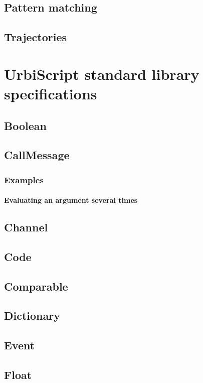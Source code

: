 \documentclass[openright,twoside,12pt]{report}
\newcommand{\us}{UrbiScript\xspace}
\begin{document}
\FloatBarrier
\section{Pattern matching}
\FloatBarrier
\section{Trajectories}

\chapter{\us standard library specifications}
\label{chap:std}

\section{Boolean}
\section{CallMessage}
\label{sect:std-callmsg}
\subsection{Examples}
\subsubsection{Evaluating an argument several times}
\label{sect:std-callmsg-examples-several}
\section{Channel}
\section{Code}
\section{Comparable}
\label{sect:std-comparable}
\section{Dictionary}
\section{Event}

\section{Float}

\end{document}
